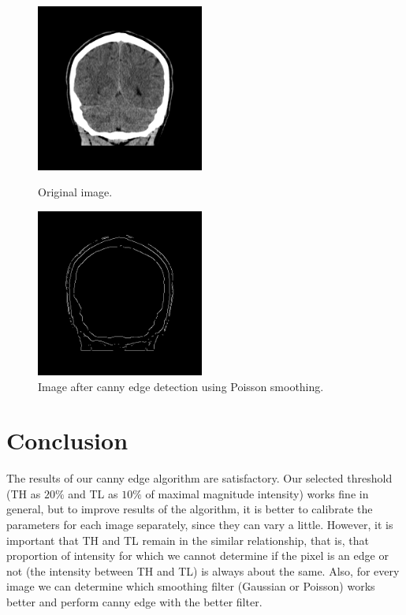 \documentclass[a4paper,11pt]{article}
\begin{document}
\newpage
\noindent
\begin{figure}[ht!]
    \begin{minipage}{0.5\textwidth}
        \centering
        \includegraphics[width=55mm]{0080.png}
        \caption{Original image.}
    \end{minipage}\hfill
    \begin{minipage}{0.5\textwidth}
        \centering
        \includegraphics[width=55mm]{0080_poisson.png}
        \caption{Image after canny edge detection using Poisson smoothing.}
    \end{minipage}\hfill
\end{figure}



\section{Conclusion}
The results of our canny edge algorithm are satisfactory.
Our selected threshold (TH as $20 \%$ and TL as $10 \%$ of maximal magnitude intensity) works fine in general,
but to improve results of the algorithm, it is better to calibrate the parameters for each image separately, since they can vary a little.
However, it is important that TH and TL remain in the similar relationship, that is, 
that proportion of intensity for which we cannot determine if the pixel is an edge or not (the intensity between TH and TL) is always about the same.
Also, for every image we can determine which smoothing filter (Gaussian or Poisson) works better and perform canny edge with the better filter.
\end{document}
